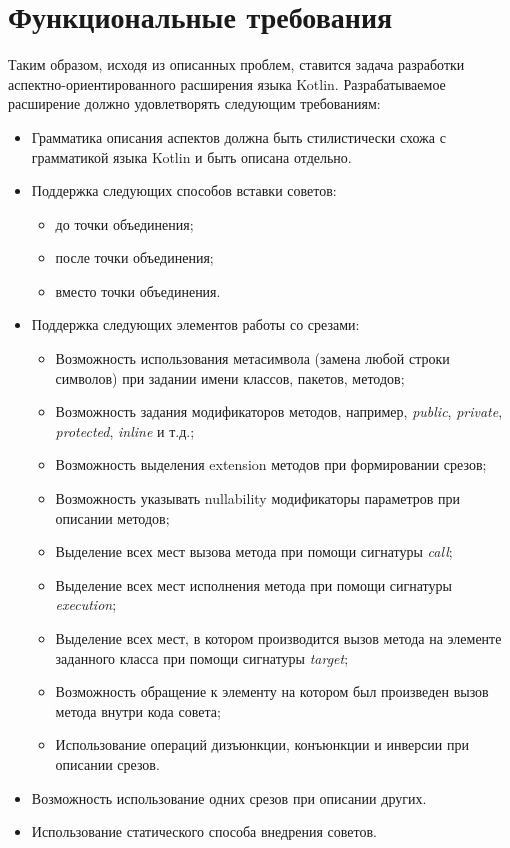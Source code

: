 \section{Функциональные требования}
Таким образом, исходя из описанных проблем, ставится задача разработки аспектно-ориентированного расширения языка Kotlin.
Разрабатываемое расширение должно удовлетворять следующим требованиям:
\begin{itemize}
    \item Грамматика описания аспектов должна быть стилистически схожа с грамматикой языка Kotlin и быть описана отдельно.
    \item Поддержка следующих способов вставки советов:
    \begin{itemize}
        \item до точки объединения;
        \item после точки объединения;
        \item вместо точки объединения.
    \end{itemize}
    \item Поддержка следующих элементов работы со срезами:
    \begin{itemize}
        \item Возможность использования метасимвола \quotes{*} (замена любой строки символов) при задании имени классов, пакетов, методов;
        \item Возможность задания модификаторов методов, например, \textit{public}, \textit{private}, \textit{protected}, \textit{inline} и т.д.;
        \item Возможность выделения extension методов при формировании срезов;
        \item Возможность указывать nullability модификаторы параметров при описании методов;
        \item Выделение всех мест вызова метода при помощи сигнатуры \textit{call};
        \item Выделение всех мест исполнения метода при помощи сигнатуры \textit{execution};
        \item Выделение всех мест, в котором производится вызов метода на элементе заданного класса при помощи сигнатуры \textit{target};
        \item Возможность обращение к элементу на котором был произведен вызов метода внутри кода совета;
        \item Использование операций дизъюнкции, конъюнкции и инверсии при описании срезов.
    \end{itemize}
    \item Возможность использование одних срезов при описании других.
    \item Использование статического способа внедрения советов.
\end{itemize}
